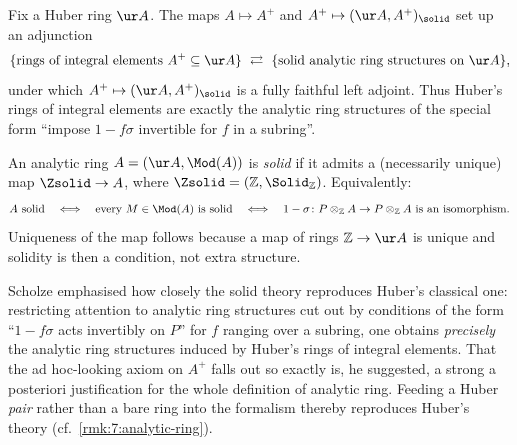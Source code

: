 \begin{theorem}
\label{thm:8:correspondence}
Fix a Huber ring $\ur A$. The maps $A\mapsto A^{+}$ and
$A^{+}\mapsto(\ur A,A^{+})_{\solid}$ set up an adjunction
\begin{equation*}
\{\text{rings of integral elements }A^{+}\subseteq\ur A\}\ \rightleftarrows\
\{\text{solid analytic ring structures on }\ur A\},
\end{equation*}
under which $A^{+}\mapsto(\ur A,A^{+})_{\solid}$ is a fully faithful left adjoint.
Thus Huber's rings of integral elements are exactly the analytic ring structures
of the special form ``impose $1-f\sigma$ invertible for $f$ in a subring''.
\end{theorem}

\begin{definition}
\label{def:8:solid-analytic-ring}
An analytic ring $A=(\ur A,\Mod(A))$ is \emph{solid} if it admits a (necessarily
unique) map $\Zsolid\to A$, where $\Zsolid=(\mathbb{Z},\Solid_{\mathbb{Z}})$.
Equivalently:
\begin{equation*}
A\ \text{solid}\quad\Longleftrightarrow\quad
\text{every }M\in\Mod(A)\ \text{is solid}\quad\Longleftrightarrow\quad
1-\sigma\colon P\otimes_{\mathbb{Z}}A\to P\otimes_{\mathbb{Z}}A\ \text{is an isomorphism}.
\end{equation*}
Uniqueness of the map follows because a map of rings $\mathbb{Z}\to\ur A$ is
unique and solidity is then a condition, not extra structure.
\end{definition}

\begin{remark}
\label{rmk:8:aposteriori}
Scholze emphasised how closely the solid theory reproduces Huber's classical one:
restricting attention to analytic ring structures cut out by conditions of the
form ``$1-f\sigma$ acts invertibly on $P$'' for $f$ ranging over a subring, one
obtains \emph{precisely} the analytic ring structures induced by Huber's rings of
integral elements. That the ad hoc-looking axiom on $A^{+}$ falls out so exactly
is, he suggested, a strong a posteriori justification for the whole definition of
analytic ring. Feeding a Huber \emph{pair} rather than a bare ring into the
formalism thereby reproduces Huber's theory (cf.\ \cref{rmk:7:analytic-ring}).
\end{remark}
